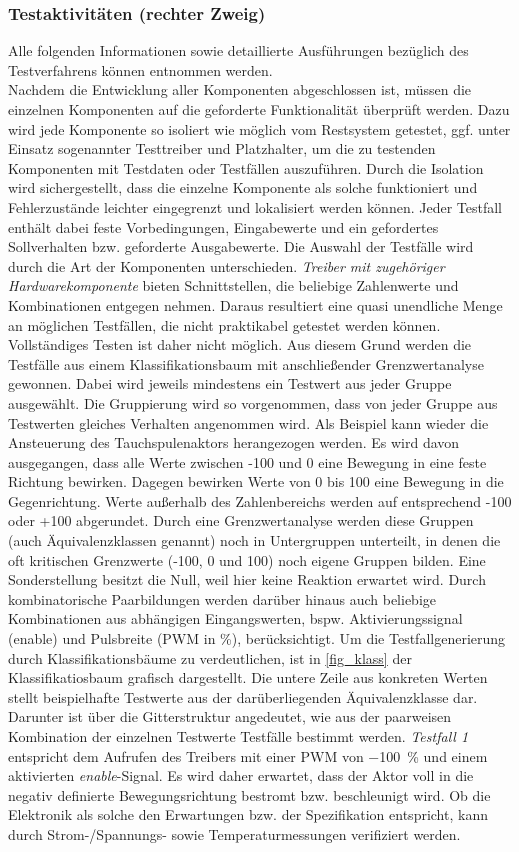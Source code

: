 \subsubsection{Testaktivitäten (rechter Zweig)}
Alle folgenden Informationen sowie detaillierte Ausführungen bezüglich des Testverfahrens können \cite{BasSof} entnommen werden.\\
Nachdem die Entwicklung aller Komponenten abgeschlossen ist, müssen die einzelnen Komponenten auf die geforderte Funktionalität überprüft werden. Dazu wird jede Komponente so isoliert wie möglich vom Restsystem getestet, ggf. unter Einsatz sogenannter Testtreiber und Platzhalter, um die zu testenden Komponenten mit Testdaten oder Testfällen auszuführen. Durch die Isolation wird sichergestellt, dass die einzelne Komponente als solche funktioniert und Fehlerzustände leichter eingegrenzt und lokalisiert werden können. Jeder Testfall enthält dabei feste Vorbedingungen, Eingabewerte und ein gefordertes Sollverhalten bzw. geforderte Ausgabewerte. Die Auswahl der Testfälle wird durch die Art der Komponenten unterschieden. \textit{Treiber mit zugehöriger Hardwarekomponente} bieten Schnittstellen, die beliebige Zahlenwerte und Kombinationen entgegen nehmen. Daraus resultiert eine quasi unendliche Menge an möglichen Testfällen, die nicht praktikabel getestet werden können. Vollständiges Testen ist daher nicht möglich. Aus diesem Grund werden die Testfälle aus einem Klassifikationsbaum mit anschließender Grenzwertanalyse gewonnen. Dabei wird jeweils mindestens ein Testwert aus jeder Gruppe ausgewählt. Die Gruppierung wird so vorgenommen, dass von jeder Gruppe aus Testwerten gleiches Verhalten angenommen wird. Als Beispiel kann wieder die Ansteuerung des Tauchspulenaktors herangezogen werden. Es wird davon ausgegangen, dass alle Werte zwischen -100 und 0 eine Bewegung in eine feste Richtung bewirken. Dagegen bewirken Werte von 0 bis 100 eine Bewegung in die Gegenrichtung. Werte außerhalb des Zahlenbereichs werden auf entsprechend -100 oder +100 abgerundet. Durch eine Grenzwertanalyse werden diese Gruppen (auch Äquivalenzklassen genannt) noch in Untergruppen unterteilt, in denen die oft kritischen Grenzwerte (-100, 0 und 100) noch eigene Gruppen bilden. Eine Sonderstellung besitzt die Null, weil hier keine Reaktion erwartet wird. Durch kombinatorische Paarbildungen werden darüber hinaus auch beliebige Kombinationen aus abhängigen Eingangswerten, bspw. Aktivierungssignal (enable) und Pulsbreite (PWM in \%), berücksichtigt. Um die Testfallgenerierung durch Klassifikationsbäume zu verdeutlichen, ist in \autoref{fig_klass} der Klassifikatiosbaum grafisch dargestellt. Die untere Zeile aus konkreten Werten stellt beispielhafte Testwerte aus der darüberliegenden Äquivalenzklasse dar. Darunter ist über die Gitterstruktur angedeutet, wie aus der paarweisen Kombination der einzelnen Testwerte Testfälle bestimmt werden. \textit{Testfall 1} entspricht dem Aufrufen des Treibers mit einer PWM von \SI{-100}{\%} und einem aktivierten \textit{enable}-Signal. Es wird daher erwartet, dass der Aktor voll in die negativ definierte Bewegungsrichtung bestromt bzw. beschleunigt wird. Ob die Elektronik als solche den Erwartungen bzw. der Spezifikation entspricht, kann durch Strom-/Spannungs- sowie Temperaturmessungen verifiziert werden. 
